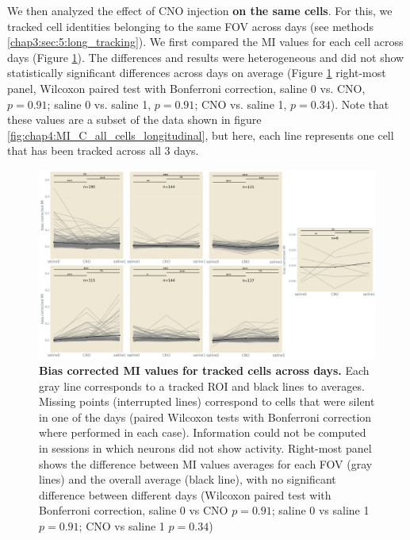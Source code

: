 We then analyzed the effect of CNO injection \textbf{on the same cells}. 
For this, we tracked cell identities belonging to the same FOV across days (see methods \ref{chap3:sec:5:long_tracking}).
We first compared the MI values for each cell across days (Figure \ref{fig:chap4:MI_C_tracked_cells_longitudinal}).
The differences and results were heterogeneous and did not show statistically significant differences across days on average (Figure \ref{fig:chap4:MI_C_tracked_cells_longitudinal} right-most panel, Wilcoxon paired test with Bonferroni correction, saline 0 vs. CNO, $p=0.91$; saline 0 vs. saline 1, $p=0.91$; CNO vs. saline 1, $p=0.34$).
Note that these values are a subset of the data shown in figure \ref{fig:chap4:MI_C_all_cells_longitudinal}, but here, each line represents one cell that has been tracked across all 3 days. 
\begin{figure}
    \centering
    \includegraphics[width=\textwidth]{Figures/Chapter4/MI_C_tracked_cells_longitudinal.pdf}
    \caption[Bias corrected MI values for tracked cells across days]{\textbf{Bias corrected MI values for tracked cells across days.} 
    Each gray line corresponds to a tracked ROI and black lines to averages. 
    Missing points (interrupted lines) correspond to cells that were silent in one of the days (paired Wilcoxon tests with Bonferroni correction where performed in each case). 
    Information could not be computed in sessions in which neurons did not show activity. 
    Right-most panel shows the difference between MI values averages for each FOV (gray lines) and the overall average (black line), with no significant difference between different days (Wilcoxon paired test with Bonferroni correction, saline 0 vs CNO $p=0.91$; saline 0 vs saline 1 $p=0.91$; CNO vs saline 1 $p=0.34$) }
    \label{fig:chap4:MI_C_tracked_cells_longitudinal}
\end{figure}

